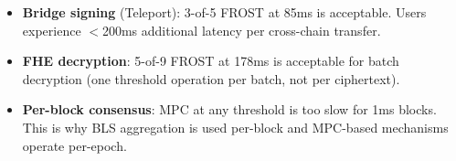 \begin{itemize}[leftmargin=2em]
\item \textbf{Bridge signing} (Teleport): 3-of-5 FROST at 85ms is acceptable. Users experience $<$200ms additional latency per cross-chain transfer.
\item \textbf{FHE decryption}: 5-of-9 FROST at 178ms is acceptable for batch decryption (one threshold operation per batch, not per ciphertext).
\item \textbf{Per-block consensus}: MPC at any threshold is too slow for 1ms blocks. This is why BLS aggregation is used per-block and MPC-based mechanisms operate per-epoch.
\end{itemize}

